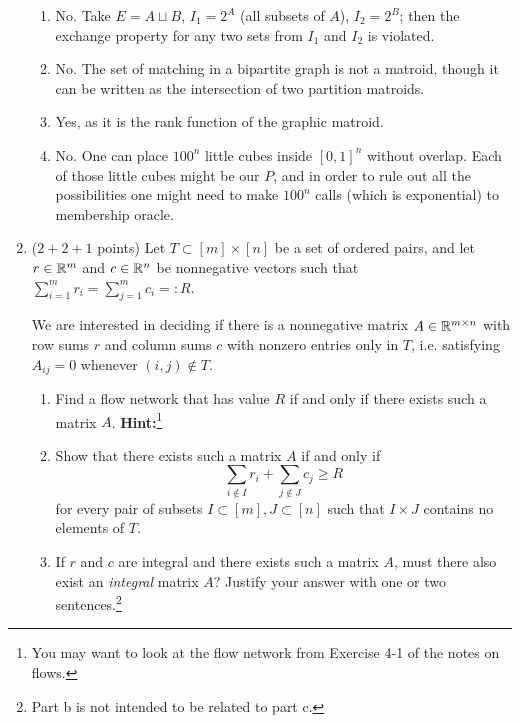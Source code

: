 \documentclass[12pt]{article}
\begin{document}
\begin{enumerate}
\begin{enumerate}
\item No. Take $E = A \sqcup B$, $I_1 = 2^A$ (all subsets of $A$), $I_2 = 2^B$; then the exchange property for any two sets from $I_1$ and $I_2$ is violated.
\item No. The set of matching in a bipartite graph is not a matroid, though it can be written as the intersection of two partition matroids.
\item Yes, as it is the rank function of the graphic matroid.
\item No. One can place $100^n$ little cubes inside $[0,1]^n$ without overlap. Each of those little cubes might be our $P$, and in order to rule out all the possibilities one might need to make $100^n$ calls (which is exponential) to membership oracle. \end{enumerate}

\newpage

\item ($2 + 2 +1$ points) Let $T \subset [m]\times[n]$ be a set of ordered pairs, and let $r \in {\mathbb R}^m$ and $c \in {\mathbb R}^n$ be nonnegative vectors such that $\sum_{i = 1}^m r_i = \sum_{j = 1}^m c_i=:R$.

We are interested in deciding if there is a nonnegative matrix $A \in {\mathbb R}^{m \times n}$ with row sums $r$ and column sums $c$ with nonzero entries only in $T$, i.e. satisfying $A_{ij} = 0$ whenever $(i,j) \not \in T$.
\begin{enumerate}
\item Find a flow network that has value $R$ if and only if there exists such a matrix $A$. \textbf{Hint:}\footnote{You may want to look at the flow network from Exercise 4-1 of the notes on flows.}
\item Show that there exists such a matrix $A$ if and only if
$$\sum_{i \not \in I} r_i + \sum_{j \not \in J} c_j \geq R$$
for every pair of subsets $I \subset [m], J \subset [n]$ such that $I \times J$ contains no elements of $T$.
\item If $r$ and $c$ are integral and there exists such a matrix $A$, must there also exist an \emph{integral} matrix $A$? Justify your answer with one or two sentences.\footnote{Part b is not intended to be related to part c.}
\end{enumerate}


\end{enumerate}
\end{document}
